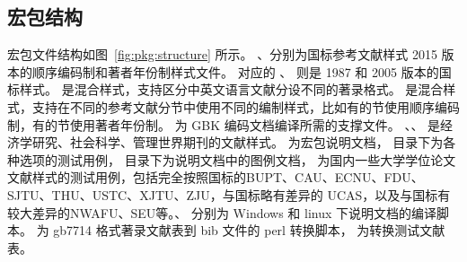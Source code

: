 \documentclass[11pt]{article} %
\begin{document}
\subsection{宏包结构}

宏包文件结构如图~\ref{fig:pkg:structure} 所示。
、分别为国标参考文献样式 2015 版本的顺序编码制和著者年份制样式文件。
对应的 、 则是 1987 和 2005 版本的国标样式。
 是混合样式，支持区分中英文语言文献分设不同的著录格式。
 是混合样式，支持在不同的参考文献分节中使用不同的编制样式，比如有的节使用顺序编码制，有的节使用著者年份制。
 为 GBK 编码文档编译所需的支撑文件。
、、 是经济学研究、社会科学、管理世界期刊的文献样式。%
 为宏包说明文档， 目录下为各种选项的测试用例，
 目录下为说明文档中的图例文档， 为国内一些大学学位论文文献样式的测试用例，包括完全按照国标的BUPT、CAU、ECNU、FDU、SJTU、THU、USTC、XJTU、ZJU，与国标略有差异的 UCAS，以及与国标有较大差异的NWAFU、SEU等。、 分别为 Windows 和 linux 下说明文档的编译脚本。 为 gb7714 格式著录文献表到 bib 文件的 perl 转换脚本， 为转换测试文献表。
\end{document}
